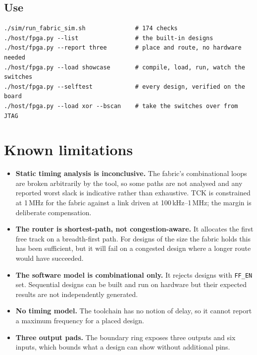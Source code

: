 \documentclass[11pt,a4paper]{article}
\begin{document}
\subsection{Use}

\begin{lstlisting}[style=sh]
./sim/run_fabric_sim.sh              # 174 checks
./host/fpga.py --list                # the built-in designs
./host/fpga.py --report three        # place and route, no hardware needed
./host/fpga.py --load showcase       # compile, load, run, watch the switches
./host/fpga.py --selftest            # every design, verified on the board
./host/fpga.py --load xor --bscan    # take the switches over from JTAG
\end{lstlisting}

\section{Known limitations}

\begin{itemize}
  \item \textbf{Static timing analysis is inconclusive.} The fabric's
        combinational loops are broken arbitrarily by the tool, so some paths are
        not analysed and any reported worst slack is indicative rather than
        exhaustive. TCK is constrained at 1\,MHz for the fabric against a link
        driven at 100\,kHz--1\,MHz; the margin is deliberate compensation.
  \item \textbf{The router is shortest-path, not congestion-aware.} It allocates
        the first free track on a breadth-first path. For designs of the size the
        fabric holds this has been sufficient, but it will fail on a congested
        design where a longer route would have succeeded.
  \item \textbf{The software model is combinational only.} It rejects designs
        with \texttt{FF\_EN} set. Sequential designs can be built and run on
        hardware but their expected results are not independently generated.
  \item \textbf{No timing model.} The toolchain has no notion of delay, so it
        cannot report a maximum frequency for a placed design.
  \item \textbf{Three output pads.} The boundary ring exposes three outputs and
        six inputs, which bounds what a design can show without additional pins.
\end{itemize}
\end{document}
